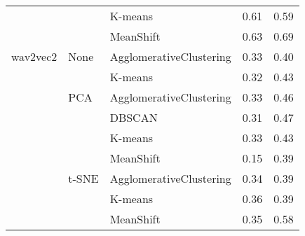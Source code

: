\begin{tabular}{lllll}
         &      & K-means &  0.61 &      0.59 \\
         &      & MeanShift &  0.63 &      0.69 \\
\midrule
wav2vec2 & None & AgglomerativeClustering &  0.33 &      0.40 \\
         &      & K-means &  0.32 &      0.43 \\
         & PCA & AgglomerativeClustering &  0.33 &      0.46 \\
         &      & DBSCAN &  0.31 &      0.47 \\
         &      & K-means &  0.33 &      0.43 \\
         &      & MeanShift &  0.15 &      0.39 \\
         & t-SNE & AgglomerativeClustering &  0.34 &      0.39 \\
         &      & K-means &  0.36 &      0.39 \\
         &      & MeanShift &  0.35 &      0.58 \\
\bottomrule
\end{tabular}
